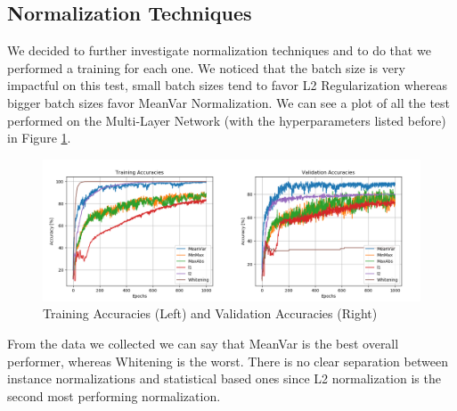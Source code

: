 \documentclass[10pt,a4paper]{report}
\begin{document}
\subsection{Normalization Techniques}
We decided to further investigate normalization techniques and to do that we performed a training for each one. We noticed that the batch size is very impactful on this test, small batch sizes tend to favor L2 Regularization whereas bigger batch sizes favor MeanVar Normalization. We can see a plot of all the test performed on the Multi-Layer Network (with the hyperparameters listed before) in Figure \ref{fig:norm_test}.
\begin{figure}[!ht]
\centering
\includegraphics[width=\linewidth]{accs.png}
\caption{Training Accuracies (Left) and Validation Accuracies (Right)}
\label{fig:norm_test}
\end{figure}
From the data we collected we can say that MeanVar is the best overall performer, whereas Whitening is the worst. There is no clear separation between instance normalizations and statistical based ones since L2 normalization is the second most performing normalization.  
\end{document}
